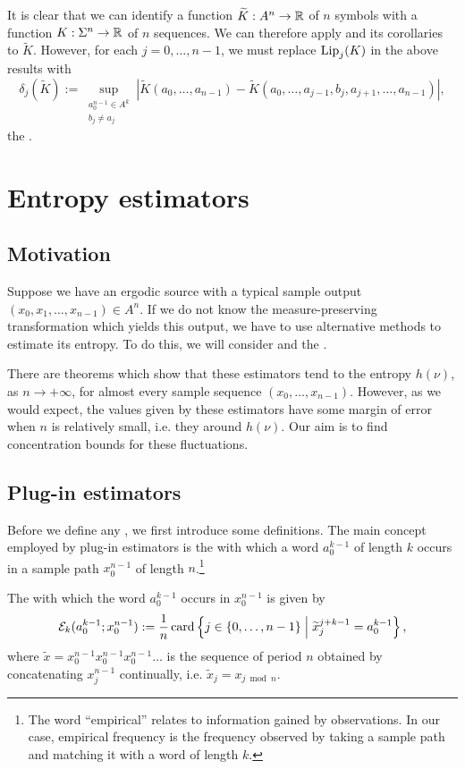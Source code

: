 It is clear that we can identify a function $\widetilde{K} : A^n \to \mathbb{R}$ of $n$ symbols with a function $K : \Sigma^n \to \mathbb{R}$ of $n$ sequences. We can therefore apply  and its corollaries to $\tilde{K}$. However, for each $j = 0, \dots, n - 1$, we must replace $\operatorname{Lip}_j(K)$ in the above results with
\[
	\delta_j(\tilde{K}) := \sup_{\substack{a_0^{n - 1} \in A^k \\ b_j \neq a_j}}{|\tilde{K}(a_0, \dots, a_{n - 1}) - \tilde{K}(a_0, \dots, a_{j - 1}, b_j, a_{j + 1}, \dots, a_{n - 1})|},
\]
the .

\section{Entropy estimators}\label{sec:estimator-bounds}
\subsection{Motivation}
Suppose we have an ergodic source with a typical sample output $(x_0, x_1, \dots, x_{n - 1}) \in A^n$. If we do not know the measure-preserving transformation which yields this output, we have to use alternative methods to estimate its entropy. To do this, we will consider  and the .

There are theorems which show that these estimators tend to the entropy $h(\nu)$, as $n \to +\infty$, for almost every sample sequence $(x_0, \dots, x_{n - 1})$. However, as we would expect, the values given by these estimators have some margin of error when $n$ is relatively small, i.e. they  around $h(\nu)$. Our aim is to find concentration bounds for these fluctuations.

\subsection{Plug-in estimators}
Before we define any , we first introduce some definitions. The main concept employed by plug-in estimators is the  with which a word $a_0^{k - 1}$ of length $k$ occurs in a sample path $x_0^{n - 1}$ of length $n$.\footnote{The word ``empirical'' relates to information gained by observations. In our case, empirical frequency is the frequency observed by taking a sample path and matching it with a word of length $k$.}

\begin{definition}
	The  with which the word $a_0^{k - 1}$ occurs in $x_0^{n - 1}$ is given by
	\[
		\mathcal{E}_k(a_0^{k - 1}; x_0^{n - 1}) := \frac{1}{n}\operatorname{card}\left\{j \in \{0, \dots, n - 1\} \mathrel{}\middle|\mathrel{} \widetilde{x}_j^{j + k - 1} = a_0^{k - 1} \right\},
	\]
	where $\tilde{x} = x_0^{n - 1} x_0^{n - 1} x_0^{n - 1} \dots$ is the sequence of period $n$ obtained by concatenating $x_j^{n - 1}$ continually, i.e. $\tilde{x}_j = x_{j \bmod n}$.
\end{definition}

